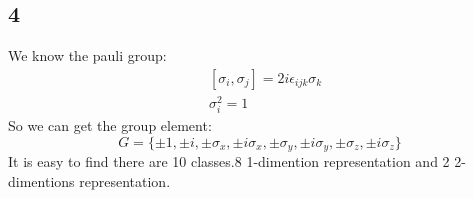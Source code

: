 \documentclass{article}
\begin{document}
\begin{CJK*}{GBK}{song}
\section{4}
We know the pauli group:
\begin{equation}
\begin{aligned}
&[\sigma_i,\sigma_j]=2i\epsilon_{ijk}\sigma_k\\
&\sigma_i^2=1
\end{aligned}
\end{equation}
So we can get the group element:
\begin{equation}
G=\{\pm 1,\pm i,\pm \sigma_x,\pm i\sigma_x,\pm \sigma_y,\pm i\sigma_y,\pm \sigma_z,\pm i\sigma_z\}
\end{equation}
It is easy to find there are 10 classes.8 1-dimention representation and 2 2-dimentions representation.














\end{CJK*}
\end{document}
